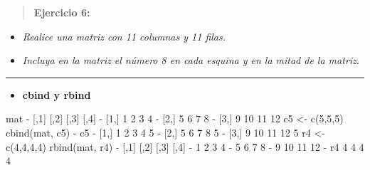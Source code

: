 \documentclass[
]{book}
\newenvironment{Shaded}{\begin{snugshade}}{\end{snugshade}}
\newcommand{\DecValTok}[1]{\textcolor[rgb]{0.00,0.00,0.81}{#1}}
\newcommand{\FunctionTok}[1]{\textcolor[rgb]{0.00,0.00,0.00}{#1}}
\newcommand{\NormalTok}[1]{#1}
\newcommand{\OtherTok}[1]{\textcolor[rgb]{0.56,0.35,0.01}{#1}}
\newcommand{\SpecialCharTok}[1]{\textcolor[rgb]{0.00,0.00,0.00}{#1}}
\providecommand{\tightlist}{%
  \setlength{\itemsep}{0pt}\setlength{\parskip}{0pt}}
\begin{document}
\begin{quote}
\textbf{Ejercicio 6:}
\end{quote}

\begin{itemize}
\item
  \emph{Realice una matriz con 11 columnas y 11 filas.}
\item
  \emph{Incluya en la matriz el número 8 en cada esquina y en la mitad de la matriz.}
\end{itemize}

\begin{center}\rule{0.5\linewidth}{0.5pt}\end{center}

\begin{itemize}
\tightlist
\item
  \textbf{cbind y rbind}
\end{itemize}

\begin{Shaded}
\begin{Highlighting}[]
\NormalTok{mat}
\SpecialCharTok{{-}}\NormalTok{      [,}\DecValTok{1}\NormalTok{] [,}\DecValTok{2}\NormalTok{] [,}\DecValTok{3}\NormalTok{] [,}\DecValTok{4}\NormalTok{]}
\SpecialCharTok{{-}}\NormalTok{ [}\DecValTok{1}\NormalTok{,]    }\DecValTok{1}    \DecValTok{2}    \DecValTok{3}    \DecValTok{4}
\SpecialCharTok{{-}}\NormalTok{ [}\DecValTok{2}\NormalTok{,]    }\DecValTok{5}    \DecValTok{6}    \DecValTok{7}    \DecValTok{8}
\SpecialCharTok{{-}}\NormalTok{ [}\DecValTok{3}\NormalTok{,]    }\DecValTok{9}   \DecValTok{10}   \DecValTok{11}   \DecValTok{12}
\NormalTok{c5 }\OtherTok{\textless{}{-}} \FunctionTok{c}\NormalTok{(}\DecValTok{5}\NormalTok{,}\DecValTok{5}\NormalTok{,}\DecValTok{5}\NormalTok{)}
\FunctionTok{cbind}\NormalTok{(mat, c5)}
\SpecialCharTok{{-}}\NormalTok{                 c5}
\SpecialCharTok{{-}}\NormalTok{ [}\DecValTok{1}\NormalTok{,] }\DecValTok{1}  \DecValTok{2}  \DecValTok{3}  \DecValTok{4}  \DecValTok{5}
\SpecialCharTok{{-}}\NormalTok{ [}\DecValTok{2}\NormalTok{,] }\DecValTok{5}  \DecValTok{6}  \DecValTok{7}  \DecValTok{8}  \DecValTok{5}
\SpecialCharTok{{-}}\NormalTok{ [}\DecValTok{3}\NormalTok{,] }\DecValTok{9} \DecValTok{10} \DecValTok{11} \DecValTok{12}  \DecValTok{5}
\NormalTok{r4 }\OtherTok{\textless{}{-}} \FunctionTok{c}\NormalTok{(}\DecValTok{4}\NormalTok{,}\DecValTok{4}\NormalTok{,}\DecValTok{4}\NormalTok{,}\DecValTok{4}\NormalTok{)}
\FunctionTok{rbind}\NormalTok{(mat, r4)}
\SpecialCharTok{{-}}\NormalTok{    [,}\DecValTok{1}\NormalTok{] [,}\DecValTok{2}\NormalTok{] [,}\DecValTok{3}\NormalTok{] [,}\DecValTok{4}\NormalTok{]}
\SpecialCharTok{{-}}       \DecValTok{1}    \DecValTok{2}    \DecValTok{3}    \DecValTok{4}
\SpecialCharTok{{-}}       \DecValTok{5}    \DecValTok{6}    \DecValTok{7}    \DecValTok{8}
\SpecialCharTok{{-}}       \DecValTok{9}   \DecValTok{10}   \DecValTok{11}   \DecValTok{12}
\SpecialCharTok{{-}}\NormalTok{ r4    }\DecValTok{4}    \DecValTok{4}    \DecValTok{4}    \DecValTok{4}
\end{Highlighting}
\end{Shaded}
\end{document}
